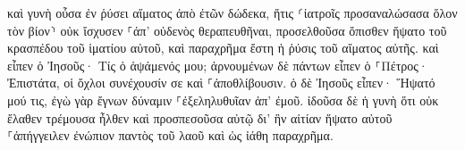 \documentclass{openreader}
\begin{document}
καὶ γυνὴ οὖσα ἐν ῥύσει αἵματος ἀπὸ ἐτῶν δώδεκα, ἥτις ⸂ἰατροῖς προσαναλώσασα ὅλον τὸν βίον⸃ οὐκ ἴσχυσεν ⸀ἀπ’ οὐδενὸς θεραπευθῆναι, 
προσελθοῦσα ὄπισθεν ἥψατο τοῦ κρασπέδου τοῦ ἱματίου αὐτοῦ, καὶ παραχρῆμα ἔστη ἡ ῥύσις τοῦ αἵματος αὐτῆς. 
καὶ εἶπεν ὁ Ἰησοῦς· Τίς ὁ ἁψάμενός μου; ἀρνουμένων δὲ πάντων εἶπεν ὁ ⸀Πέτρος· Ἐπιστάτα, οἱ ὄχλοι συνέχουσίν σε καὶ ⸀ἀποθλίβουσιν. 
ὁ δὲ Ἰησοῦς εἶπεν· Ἥψατό μού τις, ἐγὼ γὰρ ἔγνων δύναμιν ⸀ἐξεληλυθυῖαν ἀπ’ ἐμοῦ. 
ἰδοῦσα δὲ ἡ γυνὴ ὅτι οὐκ ἔλαθεν τρέμουσα ἦλθεν καὶ προσπεσοῦσα αὐτῷ δι’ ἣν αἰτίαν ἥψατο αὐτοῦ ⸀ἀπήγγειλεν ἐνώπιον παντὸς τοῦ λαοῦ καὶ ὡς ἰάθη παραχρῆμα. 
\end{document}
